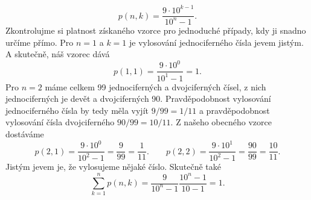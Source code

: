 \begin{example}
\begin{equation*}
     p(n,k) = \dfrac{9\cdot10^{k-1}}{10^n-1}.
   \end{equation*}
   Zkontrolujme si platnost získaného vzorce pro jednoduché případy, kdy ji snadno určíme přímo. 
   Pro \(n = 1\) a \(k = 1\) je vylosování jednociferného čísla jevem jistým. A skutečně, náš 
   vzorec dává
   \begin{equation*}
     p(1,1) = \dfrac{9\cdot10^0}{10^1-1} = 1.
   \end{equation*}
   Pro \(n = 2\) máme celkem \num{99} jednociferných a dvojciferných čísel, z nich jednociferných 
   je devět a dvojciferných \num{90}. Pravděpodobnost vylosování jednociferného čísla by tedy měla 
   vyjít \(9/99=1/11\) a pravděpodobnost vylosování čísla dvojciferného \(90/99=10/11\). Z našeho 
   obecného vzorce dostáváme
   \begin{equation*}
     p(2,1) = \dfrac{9\cdot10^0}{10^2-1} = \frac{9}{99} = \frac{1}{11}. \qquad
     p(2,2) = \dfrac{9\cdot10^1}{10^2-1} = \frac{90}{99} = \frac{10}{11}.
   \end{equation*}
   Jistým jevem je, že vylosujeme nějaké číslo. Skutečně také
   \begin{equation*}
     \sum_{k=1}^{n}p(n,k) = \dfrac{9}{10^n - 1}\dfrac{10^n - 1}{10 - 1} =1.
   \end{equation*}
  \normalsize
\end{example}